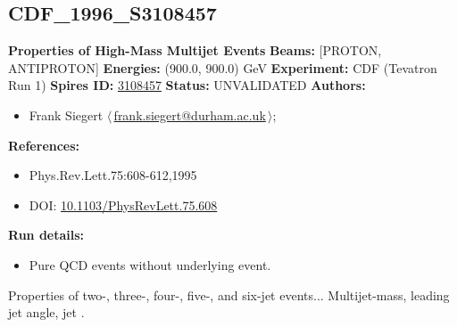 \clearpage

\subsection[CDF\_1996\_S3108457]{CDF\_1996\_S3108457\,\cite{Abe:1995rw}}
\textbf{Properties of High-Mass Multijet Events}\newline
\textbf{Beams:} [PROTON, ANTIPROTON] \newline
\textbf{Energies:} (900.0, 900.0) GeV \newline
\textbf{Experiment:} CDF (Tevatron Run 1) \newline
\textbf{Spires ID:} \href{http://www.slac.stanford.edu/spires/find/hep/www?rawcmd=key+3108457}{3108457}\newline
\textbf{Status:} UNVALIDATED\newline
\textbf{Authors:}
\begin{itemize}
  \item Frank Siegert $\langle\,$\href{mailto:frank.siegert@durham.ac.uk}{frank.siegert@durham.ac.uk}$\,\rangle$;
\end{itemize}
\textbf{References:}
\begin{itemize}
  \item Phys.Rev.Lett.75:608-612,1995
  \item DOI: \href{http://dx.doi.org/10.1103/PhysRevLett.75.608}{10.1103/PhysRevLett.75.608}
\end{itemize}
\textbf{Run details:}
\begin{itemize}

  \item Pure QCD events without underlying event.\end{itemize}

\noindent Properties of two-, three-, four-, five-, and six-jet events... Multijet-mass, leading jet angle, jet \pT.

\clearpage


\clearpage

